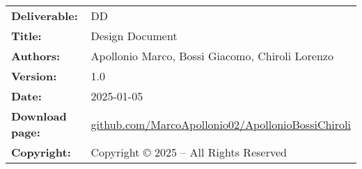 \documentclass{Configuration_Files/PoliMi3i_thesis}
\begin{document}

\pagestyle{empty} %
\frontmatter %


\begin{table}[h!]
    \begin{tabu} to \textwidth { X[0.3,r,p] X[0.7,l,p] }
        \hline

        \textbf{Deliverable:}   & DD                                                                                                                  \\
        \textbf{Title:}         & Design Document                                                                                                     \\
        \textbf{Authors:}       & Apollonio Marco, Bossi Giacomo, Chiroli Lorenzo                                                                     \\
        \textbf{Version:}       & 1.0                                                                                                                 \\
        \textbf{Date:}          & 2025-01-05                                                                                                          \\
        \textbf{Download page:} & \href{https://github.com/MarcoApollonio02/ApollonioBossiChiroli}{github.com/MarcoApollonio02/ApollonioBossiChiroli} \\
        \textbf{Copyright:}     & Copyright © 2025 – All Rights Reserved                                                                              \\
        \hline
    \end{tabu}
\end{table}
\thispagestyle{empty} %
\end{document}
